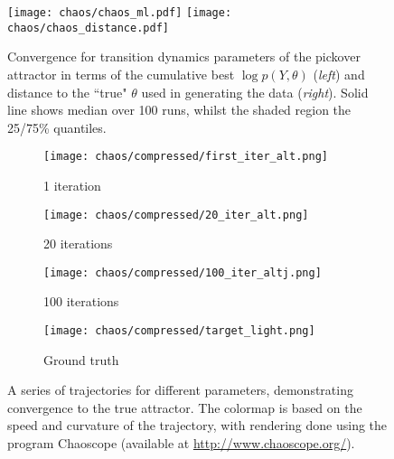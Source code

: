 

\begin{figure*}[t]
	\centering
	\texttt{[image: chaos/chaos\_ml.pdf]}
	\texttt{[image: chaos/chaos\_distance.pdf]}
	\caption{Convergence for transition dynamics parameters of the pickover attractor in terms of the cumulative best $\log p\left(Y,\theta\right)$ (\emph{left}) and distance to the ``true" $\theta$ used in generating the data (\emph{right}). Solid line shows median over 100 runs, whilst the shaded region the 25/75\% quantiles.  \label{fig:chaos}
		\vspace{6pt}}
\end{figure*}

\begin{figure}[t]
	\centering
	\begin{subfigure}[t]{0.24\textwidth}
		\centering
		\texttt{[image: chaos/compressed/first\_iter\_alt.png]}
		\caption{1 iteration}
	\end{subfigure}
	\begin{subfigure}[t]{0.24\textwidth}
		\centering
		\tiny
		\texttt{[image: chaos/compressed/20\_iter\_alt.png]}
		\caption{20 iterations}
	\end{subfigure}
	\begin{subfigure}[t]{0.24\textwidth}
		\centering
		\tiny
		\texttt{[image: chaos/compressed/100\_iter\_altj.png]}
		\caption{100 iterations}
	\end{subfigure}
	\begin{subfigure}[t]{0.24\textwidth}
		\centering
		\tiny
		\texttt{[image: chaos/compressed/target\_light.png]}
		\caption{Ground truth}
	\end{subfigure}
	\vspace{5pt}
	\caption{A series of trajectories for different parameters, demonstrating convergence to the true attractor.  The colormap is based on the speed and curvature of the trajectory, with rendering done using the program Chaoscope (available at {\href{http://www.chaoscope.org/}{http://www.chaoscope.org/}}). \label{fig:chaoscope}}
	\vspace{5pt}
\end{figure}

